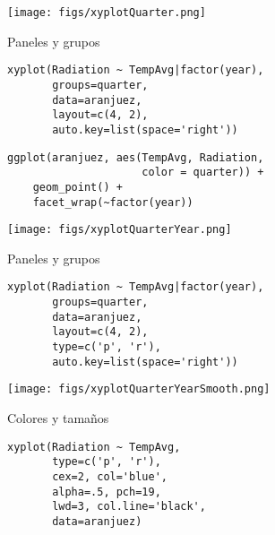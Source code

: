 \documentclass[aspectratio=169, usenames,svgnames,dvipsnames]{beamer}
\begin{document}
\begin{frame}[label={sec:orgca32312}]{}
\begin{center}
\texttt{[image: figs/xyplotQuarter.png]}
\end{center}
\end{frame}

\begin{frame}[label={sec:org8df30bd},fragile]{Paneles y grupos}
 \lstset{language=r,label= ,caption= ,captionpos=b,numbers=none}
\begin{lstlisting}
xyplot(Radiation ~ TempAvg|factor(year),
       groups=quarter,
       data=aranjuez,
       layout=c(4, 2),
       auto.key=list(space='right'))
\end{lstlisting}

\lstset{language=r,label= ,caption= ,captionpos=b,numbers=none}
\begin{lstlisting}
ggplot(aranjuez, aes(TempAvg, Radiation,
                     color = quarter)) + 
    geom_point() +
    facet_wrap(~factor(year))
\end{lstlisting}
\end{frame}

\begin{frame}[label={sec:orgc6a17a4}]{}
\begin{center}
\texttt{[image: figs/xyplotQuarterYear.png]}
\end{center}
\end{frame}

\begin{frame}[label={sec:org8e4e75e},fragile]{Paneles y grupos}
 \lstset{language=r,label= ,caption= ,captionpos=b,numbers=none}
\begin{lstlisting}
xyplot(Radiation ~ TempAvg|factor(year),
       groups=quarter,
       data=aranjuez,
       layout=c(4, 2),
       type=c('p', 'r'),
       auto.key=list(space='right'))
\end{lstlisting}
\end{frame}

\begin{frame}[label={sec:org6b297f0}]{}
\begin{center}
\texttt{[image: figs/xyplotQuarterYearSmooth.png]}
\end{center}
\end{frame}

\begin{frame}[label={sec:org8f8a039},fragile]{Colores y tamaños}
 \lstset{language=r,label= ,caption= ,captionpos=b,numbers=none}
\begin{lstlisting}
xyplot(Radiation ~ TempAvg,
       type=c('p', 'r'),
       cex=2, col='blue',
       alpha=.5, pch=19,
       lwd=3, col.line='black',
       data=aranjuez)
\end{lstlisting}
\end{frame}
\end{document}
